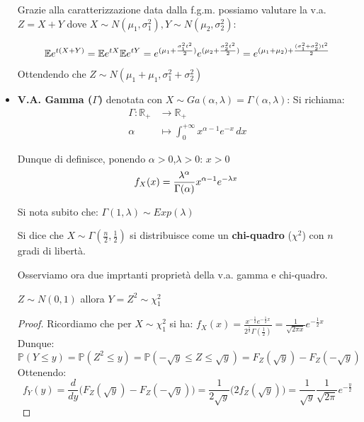 \begin{itemize}
    \vspace{10px}
    \newpage
    Grazie alla caratterizzazione data dalla f.g.m. possiamo valutare la v.a. $Z=X+Y$ dove $X\sim N(\mu_1,\sigma_1^2), Y\sim N(\mu_2, \sigma_2^2)$:
    
    \[\mathbb{E} e^{t(X+Y)}=\mathbb{E} e^{tX}\mathbb{E} e^{tY}=e^{(\mu_1+\frac{\sigma_1^2t^2}{2})}e^{(\mu_2+\frac{\sigma_2^2t^2}{2})}=e^{(\mu_1+\mu_2)+\frac{(\sigma_1^2+\sigma_2^2)t^2}{2}}\]
    
    Ottendendo che $Z\sim N(\mu_1+\mu_1,\sigma_1^2+\sigma_2^2)$
    
    \vspace{10px}
    \item \textbf{V.A. Gamma ($\Gamma$)} denotata con $X\sim Ga(\alpha,\lambda)=\Gamma(\alpha,\lambda)$:
    \vspace{5px}
    \newline
    Si richiama:
    \begin{align*}
        \Gamma\colon \mathbb{R_+} & \longrightarrow \mathbb{R_+} \\
        \alpha& \longmapsto \int_0^{+\infty} x^{\alpha-1}e^{-x} \,dx
    \end{align*}
    
    Dunque di definisce, ponendo $\alpha>0$,$\lambda>0$: $x>0$ \[f_X(x) = \frac{\lambda^{\alpha}}{\Gamma(\alpha)}x^{\alpha-1}e^{-\lambda x} \hspace{3px}\]

     Si nota subito che: $\Gamma(1,\lambda)\sim Exp(\lambda)$
     
     \vspace{5px}
     
     Si dice che $X\sim \Gamma(\frac{n}{2},\frac{1}{2})$ si distribuisce come un \textbf{chi-quadro} ($\chi^2$) con $n$ gradi di libertà.
     
     \vspace{5px}
     
     Osserviamo ora due imprtanti proprietà della v.a. gamma e chi-quadro.
     
     \begin{proposition}
     $Z\sim N(0,1)$ allora $Y=Z^2\sim \chi_1^2$
     \begin{proof}
     Ricordiamo che per $X\sim\chi_1^2$ si ha: $f_X(x)=\frac{x^{-\frac{1}{2}}e^{-\frac{1}{2}x}}{2^{\frac{1}{2}}\Gamma(\frac{1}{2})}=\frac{1}{\sqrt{2\pi x}}e^{-\frac{1}{2}x}$
     Dunque: \[\mathbb{P}(Y\leq y)=\mathbb{P}(Z^2\leq y)=\mathbb{P}(-\sqrt{y}\leq Z\leq\sqrt{y})=F_Z(\sqrt{y})-F_Z(-\sqrt{y})\]
     Ottenendo: \[f_Y(y)=\frac{d}{dy}\Big(F_Z(\sqrt{y})-F_Z(-\sqrt{y})\Big)=\frac{1}{2\sqrt{y}}\big(2f_Z(\sqrt{y})\big)=\frac{1}{\sqrt{y}}\frac{1}{\sqrt{2\pi}}e^{-\frac{y}{2}}\]
     \end{proof}
     \end{proposition}
     

\end{itemize}
